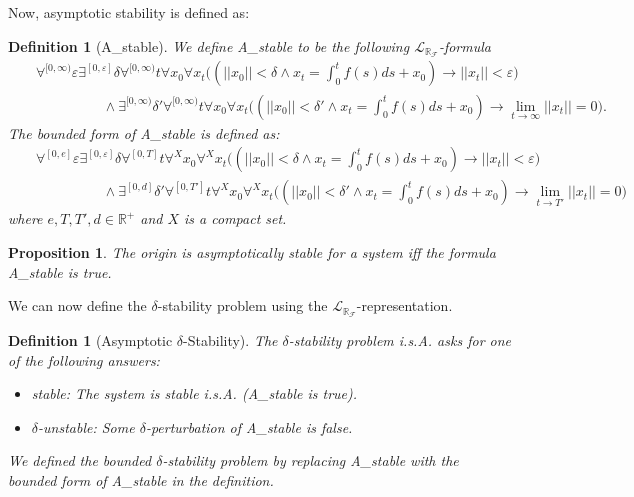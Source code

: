 \documentclass[12pt]{article}
\theoremstyle{plain}
\newtheorem{proposition}[theorem]{Proposition}
\newtheorem{definition}[theorem]{Definition}
\theoremstyle{definition}
\newcommand{\lrf}{\mathcal{L}_{\mathbb{R}_{\mathcal{F}}}}
\begin{document}
Now, asymptotic stability is defined as:
\begin{definition}[{\sf A\_stable}]
We define {\sf A\_stable} to be the following $\lrf$-formula
\begin{eqnarray*}
& &\forall^{[0,\infty)} \varepsilon\exists^{[0,\varepsilon]} \delta\forall^{[0,\infty)} t\forall x_0\forall x_t\Big((||x_0||<\delta \wedge x_t = \int_0^t f(s)ds + x_0 )\rightarrow ||x_t||<\varepsilon\Big)\\
& &\hspace{2cm}\wedge \exists^{[0,\infty)} \delta'  \forall^{[0,\infty)} t\forall x_0\forall x_t\Big( (||x_0||<\delta'\wedge x_t = \int_0^t f(s)ds + x_0 )\rightarrow \lim_{t\rightarrow \infty} ||x_t|| = 0\Big).
\end{eqnarray*}
The bounded form of {\sf A\_stable} is defined as:
\begin{eqnarray*}
& &\forall^{[0,e]} \varepsilon\exists^{[0,\varepsilon]} \delta\forall^{[0,T]} t\forall^X x_0\forall^X x_t\Big((||x_0||<\delta \wedge x_t = \int_0^t f(s)ds + x_0 )\rightarrow ||x_t||<\varepsilon\Big)\\
& &\hspace{2cm}\wedge \exists^{[0,d]} \delta'  \forall^{[0,T']} t\forall^X x_0\forall^X x_t\Big( (||x_0||<\delta'\wedge x_t = \int_0^t f(s)ds + x_0 )\rightarrow \lim_{t\rightarrow T'} ||x_t|| = 0\Big)
\end{eqnarray*}
where $e,T,T',d\in \mathbb{R}^+$ and $X$ is a compact set.
\end{definition}
\begin{proposition}
The origin is asymptotically stable for a system iff the formula {\sf A\_stable} is true.
\end{proposition}
We can now define the $\delta$-stability problem using the $\lrf$-representation.
\begin{definition}[Asymptotic $\delta$-Stability]\label{sl}
The $\delta$-stability problem i.s.A. asks for one of the following answers:
\begin{itemize}
\item {\sf stable}: The system is stable i.s.A. ({\sf A\_stable} is true).
\item {\sf $\delta$-unstable}: Some $\delta$-perturbation of {\sf A\_stable} is false.
\end{itemize}
We defined the {\em bounded} $\delta$-stability problem by replacing {\sf A\_stable} with the bounded form of {\sf A\_stable} in the definition.
\end{definition}
\end{document}
